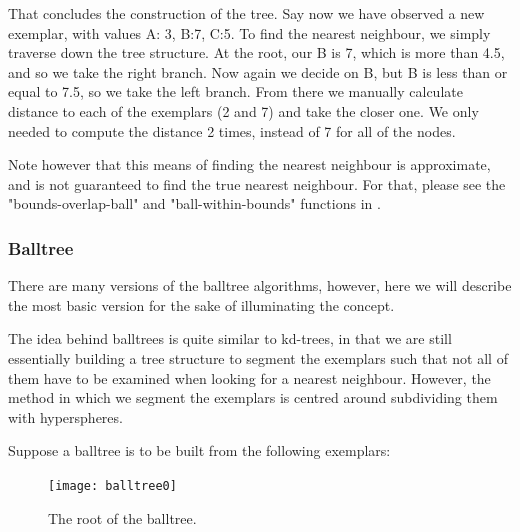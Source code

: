 \documentclass[a4paper, 12pt]{article}
\begin{document}
                    \par That concludes the construction of the tree. Say now we have observed a new exemplar, with values A: 3, B:7, C:5. To find the nearest neighbour, we simply traverse down the tree structure. At the root, our B is 7, which is more than 4.5, and so we take the right branch. Now again we decide on B, but B is less than or equal to 7.5, so we take the left branch. From there we manually calculate distance to each of the exemplars (2 and 7) and take the closer one. We only needed to compute the distance 2 times, instead of 7 for all of the nodes.
                  
                    \par Note however that this means of finding the nearest neighbour is approximate, and is not guaranteed to find the true nearest neighbour. For that, please see the "bounds-overlap-ball" and "ball-within-bounds" functions in \cite{kNearestNeighbours}.
                    
                \subsubsection{Balltree}
                
                    \par There are many versions of the balltree algorithms\cite{manyBalltrees}, however, here we will describe the most basic version for the sake of illuminating the concept.
                    
                    \newpage
                    
                    \par The idea behind balltrees is quite similar to kd-trees, in that we are still essentially building a tree structure to segment the exemplars such that not all of them have to be examined when looking for a nearest neighbour. However, the method in which we segment the exemplars is centred around subdividing them with hyperspheres. 
                    
                    \par Suppose a balltree is to be built from the following exemplars:
                    
                    \begin{figure}[h]
                        \caption{The root of the balltree.}
                        \centering
                        \texttt{[image: balltree0]}
                    \end{figure}
                    
\end{document}
